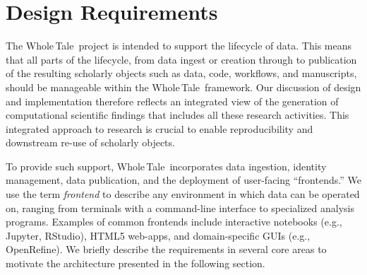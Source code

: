 \documentclass{elsarticle}
\newcommand{\wt}{Whole\,Tale}
\begin{document}
\section{Design Requirements}\label{sec:design}

The \wt\ project is intended to support the lifecycle of data. This means that all parts of the lifecycle, from data ingest or creation through to publication of the resulting scholarly objects such as data, code, workflows, and manuscripts, should be manageable within the \wt\ framework. Our discussion of design and implementation therefore reflects an integrated view of the generation of computational scientific findings that includes all these research activities. This integrated approach to research is crucial to enable reproducibility and downstream re-use of scholarly objects. 


To provide such support, \wt\ incorporates data ingestion, 
identity management, data publication, and the deployment of user-facing ``frontends.''  We use the term \emph{frontend} to describe any environment in which data can be operated on, ranging from
terminals with a command-line interface to specialized analysis programs. 
Examples of common frontends include interactive notebooks (e.g., Jupyter, RStudio),
HTML5 web-apps, and domain-specific GUIs (e.g., OpenRefine).
We briefly describe the requirements
in several core areas to motivate the architecture presented in the following section.


\end{document}
